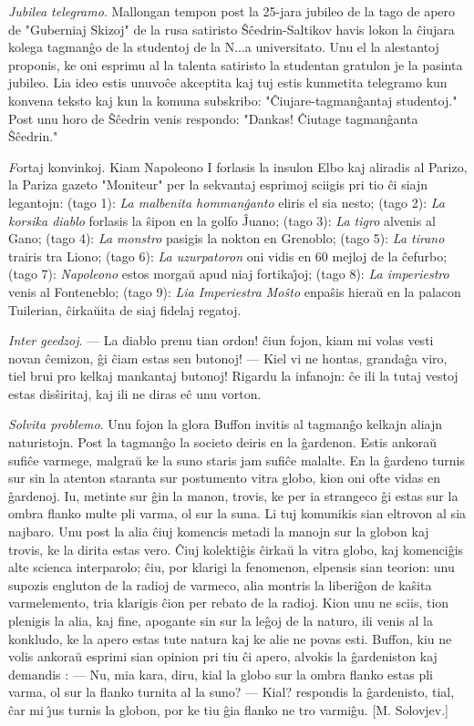\emph{Jubilea telegramo}. Mallongan tempon post la 25-jara jubileo
de la tago de apero de "Guberniaj Skizoj" de la rusa satiristo
\^S\^cedrin-Saltikov havis lokon la \^ciujara kolega tagman\^go de
la studentoj de la N...a universitato. Unu el la alestantoj
proponis, ke oni esprimu al la talenta satiristo la studentan
gratulon je la pasinta jubileo. Lia ideo estis unuvo\^ce akceptita
kaj tuj estis kunmetita telegramo kun konvena teksto kaj kun la
komuna subskribo: "\^Ciujare-tagman\^gantaj studentoj." Post unu
horo de \^S\^cedrin venis respondo: "Dankas! \^Ciutage
tagman\^ganta \^S\^cedrin."

{\emph Fortaj konvinkoj}. Kiam Napoleono I forlasis la insulon Elbo
kaj aliradis al Parizo, la Pariza gazeto "Moniteur" per la
sekvantaj esprimoj sciigis pri tio \^ci siajn legantojn: (tago 1):
{\sl La malbenita homman\^ganto} eliris el sia nesto; (tago 2): {\sl
La korsika diablo} forlasis la \^sipon en la golfo \^Juano; (tago
3): {\sl La tigro} alvenis al Gano; (tago 4): {\sl La monstro}
pasigis la nokton en Grenoblo; (tago 5): {\sl La tirano} trairis tra
Liono; (tago 6): {\sl La uzurpatoron} oni vidis en 60 mejloj de la
\^cefurbo; (tago 7): {\sl Napoleono} estos morga\u u apud niaj
fortika\^{\j}oj; (tago 8): {\sl La imperiestro} venis al Fonteneblo;
(tago 9): {\sl Lia Imperiestra Mo\^sto} enpa\^sis hiera\u u en la
palacon Tuilerian, \^cirka\u uita de siaj fidelaj regatoj.

\emph{Inter geedzoj}. --- La diablo prenu tian ordon! \^ciun fojon,
kiam mi volas vesti novan \^cemizon, \^gi \^ciam estas sen butonoj!
--- Kiel vi ne hontas, granda\^ga viro, tiel brui pro kelkaj
mankantaj butonoj! Rigardu la infanojn: \^ce ili la tutaj vestoj
estas dis\^siritaj, kaj ili ne diras e\^c unu vorton.

\emph{Solvita problemo}. Unu fojon la glora Buffon invitis al
tagman\^go kelkajn aliajn naturistojn. Post la tagman\^go la societo
deiris en la \^gardenon. Estis ankora\u u sufi\^ce varmege, malgra\u
u ke la suno staris jam sufi\^ce malalte. En la \^gardeno turnis sur
sin la atenton staranta sur postumento vitra globo, kion oni ofte
vidas en \^gardenoj. Iu, metinte sur \^gin la manon, trovis, ke per
ia strangeco \^gi estas sur la ombra flanko multe pli varma, ol sur
la suna. Li tuj komunikis sian eltrovon al sia najbaro. Unu post la
alia \^ciuj komencis metadi la manojn sur la globon kaj trovis, ke
la dirita estas vero. \^Ciuj kolekti\^gis \^cirka\u u la vitra
globo, kaj komenci\^gis alte scienca interparolo; \^ciu, por klarigi
la fenomenon, elpensis sian teorion: unu supozis engluton de la
radioj de varmeco, alia montris la liberi\^gon de ka\^sita
varmelemento, tria klarigis \^cion per rebato de la radioj. Kion unu
ne sciis, tion plenigis la alia, kaj fine, apogante sin sur la
le\^goj de la naturo, ili venis al la konkludo, ke la apero estas
tute natura kaj ke alie ne povas esti. Buffon, kiu ne volis ankora\u
u esprimi sian opinion pri tiu \^ci apero, alvokis la \^gardeniston
kaj demandis : --- Nu, mia kara, diru, kial la globo sur la ombra
flanko estas pli varma, ol sur la flanko turnita al la suno? ---
Kial? respondis la \^gardenisto, tial, \^car mi \^{\j}us turnis la
globon, por ke tiu \^gia flanko ne tro varmi\^gu. [M. Solovjev.]

